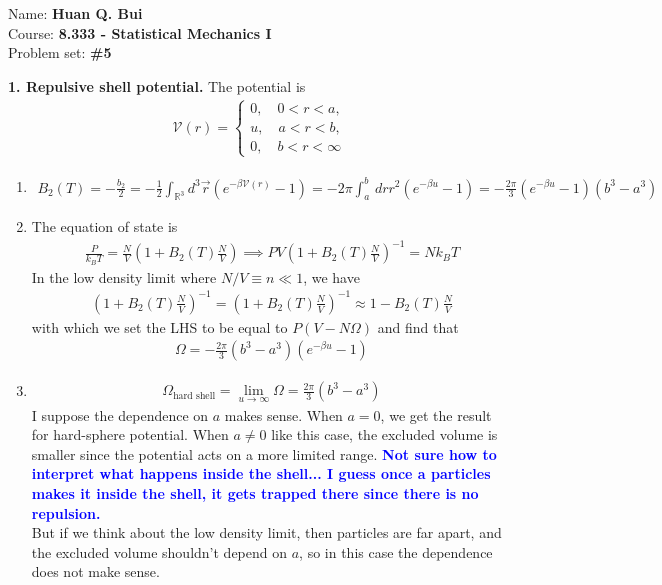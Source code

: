 \documentclass{article}
\theoremstyle{definition}
\newcommand{\be}{\beta}
\newcommand{\f}[2]{\frac{#1}{#2}}
\newcommand{\lp}{\left(}
\newcommand{\rp}{\right)}
\begin{document}
		\begin{framed}
			\noindent Name: \textbf{Huan Q. Bui}\\
			Course: \textbf{8.333 - Statistical Mechanics I}\\
			Problem set: \textbf{\#5}
		\end{framed}
	



\noindent \textbf{1. Repulsive shell potential.} The potential is 
\begin{align*}
\mathcal{V}(r) = \begin{cases}
0, \quad 0 < r < a,\\
u, \quad a < r < b,\\
0, \quad b < r < \infty
\end{cases}
\end{align*}

\begin{enumerate}[label=(\alph*)]
	\item 
	\begin{align*}
	B_2(T) = -\f{b_2}{2} = -\f{1}{2}\int_{\mathbb{R}^3} d^3 \vec{r} \lp e^{-\be \mathcal{V}(r)} - 1 \rp = -2\pi \int_a^b \,dr r^2 \lp e^{-\be u} - 1 \rp = \boxed{-\f{2\pi}{3} \lp e^{-\be u } - 1 \rp (b^3 - a^3)}
	\end{align*}
	\item The equation of state is 
	\begin{align*}
	\f{P}{k_B T} = \f{N}{V}\lp 1 + B_2(T) \f{N}{V} \rp \implies PV \lp 1 + B_2(T)\f{N}{V} \rp^{-1} = N k_B T
	\end{align*}
	In the low density limit where $N/V \equiv n \ll 1$, we have
	\begin{align*}
	\lp 1 + B_2(T) \f{N}{V}  \rp^{-1} = \lp 1 + B_2(T) \f{N}{V}\rp^{-1} \approx 1 - B_2(T) \f{N}{V}
	\end{align*}
	with which we set the LHS to be equal to $P(V-N\Omega)$ and find that 
	\begin{align*}
	\boxed{\Omega = -\f{2\pi}{3} (b^3 - a^3) \lp e^{-\be u} - 1  \rp }
	\end{align*}
	
	
	\item 
	\begin{align*}
	\Omega_\text{hard shell} = \lim_{u\to \infty} \Omega = \boxed{\f{2\pi}{3} (b^3 - a^3) }
	\end{align*}
	I suppose the dependence on $a$ makes sense. When $a=0$, we get the result for hard-sphere potential. When $a\neq 0$ like this case, the excluded volume is smaller since the potential acts on a more limited range. \textbf{\textcolor{blue}{Not sure how to interpret what happens inside the shell... I guess once a particles makes it inside the shell, it gets trapped there since there is no repulsion.}}\\
	
	But if we think about the low density limit, then particles are far apart, and the excluded volume shouldn't depend on $a$, so in this case the dependence does not make sense.
\end{enumerate}
\end{document}
